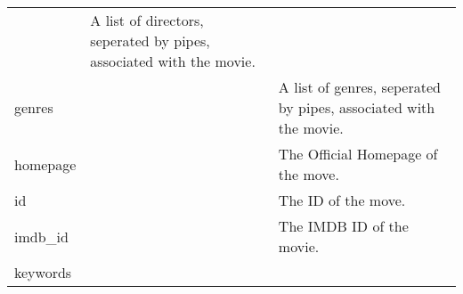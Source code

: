 \documentclass[11pt]{article}
\begin{document}
\begin{longtable}[]{@{}lll@{}}
\begin{minipage}[t]{0.05\columnwidth}
\strut
\end{minipage} & \begin{minipage}[t]{0.28\columnwidth}\raggedright\strut
A list of directors, seperated by pipes, associated with the
movie.\strut
\end{minipage}\tabularnewline
\begin{minipage}[t]{0.28\columnwidth}\raggedright\strut
genres\strut
\end{minipage} & \begin{minipage}[t]{0.05\columnwidth}\raggedright\strut
\strut
\end{minipage} & \begin{minipage}[t]{0.28\columnwidth}\raggedright\strut
A list of genres, seperated by pipes, associated with the movie.\strut
\end{minipage}\tabularnewline
\begin{minipage}[t]{0.28\columnwidth}\raggedright\strut
homepage\strut
\end{minipage} & \begin{minipage}[t]{0.05\columnwidth}\raggedright\strut
\strut
\end{minipage} & \begin{minipage}[t]{0.28\columnwidth}\raggedright\strut
The Official Homepage of the move.\strut
\end{minipage}\tabularnewline
\begin{minipage}[t]{0.28\columnwidth}\raggedright\strut
id\strut
\end{minipage} & \begin{minipage}[t]{0.05\columnwidth}\raggedright\strut
\strut
\end{minipage} & \begin{minipage}[t]{0.28\columnwidth}\raggedright\strut
The ID of the move.\strut
\end{minipage}\tabularnewline
\begin{minipage}[t]{0.28\columnwidth}\raggedright\strut
imdb\_id\strut
\end{minipage} & \begin{minipage}[t]{0.05\columnwidth}\raggedright\strut
\strut
\end{minipage} & \begin{minipage}[t]{0.28\columnwidth}\raggedright\strut
The IMDB ID of the movie.\strut
\end{minipage}\tabularnewline
\begin{minipage}[t]{0.28\columnwidth}\raggedright\strut
keywords\strut
\end{minipage} & \begin{minipage}[t]{0.05\columnwidth}\raggedright\strut

\end{minipage}
\end{longtable}
\end{document}
